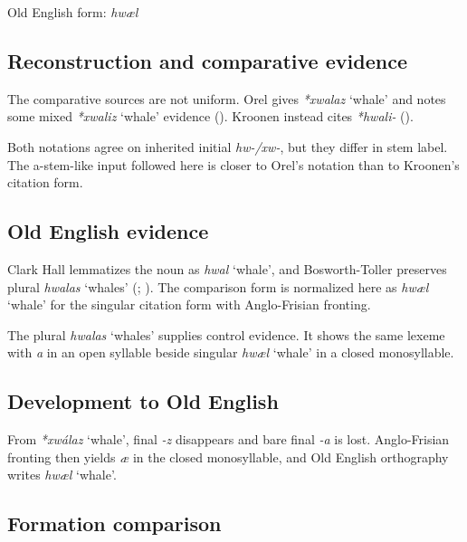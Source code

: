\documentclass[
  british,
  a4paper,
  openany]{book}
\providecommand{\Recon}[1]{\emph{*#1}}
{\catcode`→=\active \global\def→{\ensuremath{\rightarrow}}}
\providecommand{\Recon}[1]{\emph{*#1}}
{\catcode`→=\active \global\def→{\ensuremath{\rightarrow}}}
\begin{document}
Old English form: \emph{hwæl}

\subsection{Reconstruction and comparative
evidence}\label{reconstruction-and-comparative-evidence-103}

The comparative sources are not uniform. Orel gives {\Recon{xwalaz}
`whale'} and notes some mixed {\Recon{xwaliz} `whale'} evidence
(). Kroonen instead cites
{\emph{*hwali-}} ().

Both notations agree on inherited initial \emph{hw-/xw-}, but they
differ in stem label. The a-stem-like input followed here is closer to
Orel's notation than to Kroonen's citation form.

\subsection{Old English evidence}\label{old-english-evidence-103}

Clark Hall lemmatizes the noun as {\emph{hwal}} `whale', and
Bosworth-Toller preserves plural {\emph{hwalas}} `whales'
(;
). The
comparison form is normalized here as {\emph{hwæl}} `whale' for the
singular citation form with Anglo-Frisian fronting.

The plural {\emph{hwalas}} `whales' supplies control evidence. It shows
the same lexeme with \emph{a} in an open syllable beside singular
{\emph{hwæl}} `whale' in a closed monosyllable.

\subsection{Development to Old
English}\label{development-to-old-english-103}

From \Recon{xwálaz} `whale', final \emph{-z} disappears and bare final
\emph{-a} is lost. Anglo-Frisian fronting then yields \emph{æ} in the
closed monosyllable, and Old English orthography writes {\emph{hwæl}}
`whale'.

\subsection{Formation comparison}\label{formation-comparison-7}
\end{document}
